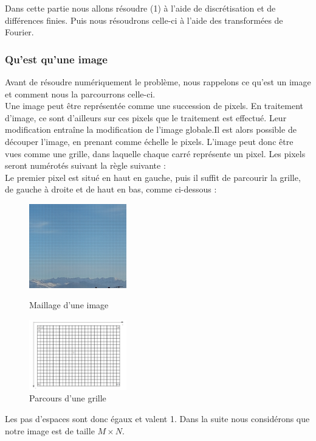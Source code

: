 Dans cette partie nous allons résoudre (1) à l'aide de discrétisation et de différences finies. Puis nous résoudrons celle-ci à l'aide des transformées de Fourier. \\
\subsubsection{Qu'est qu'une image}
Avant de résoudre numériquement le problème, nous rappelons ce qu'est un image et comment nous la  parcourrons celle-ci.\\
Une image peut être représentée comme une succession de pixels. En traitement d'image, ce sont d'ailleurs sur ces pixels que le traitement est effectué. Leur modification entraîne la modification de l'image globale.Il est alors possible de découper l'image, en prenant comme échelle le pixels. L'image peut donc être vues comme une grille, dans laquelle chaque carré représente un pixel. Les pixels seront numérotés suivant la règle suivante : \\

Le premier pixel est situé en haut en gauche, puis il suffit de parcourir la grille, de gauche à droite et de haut en bas, comme ci-dessous :  
\begin{figure}[!htb]
   \begin{minipage}{0.5\textwidth}
     \centering
     \includegraphics[width = 120pt]{Images/Montagne_grille.jpg}
        \caption{Maillage d'une image}
      \end{minipage}\hfill
   \begin{minipage}{0.5\textwidth}
     \centering
     \includegraphics[width = 120pt]{Images/grille.png}
	\caption{Parcours d'une grille}
      \end{minipage}\hfill
\end{figure}

Les pas d'espaces sont donc égaux et valent 1. Dans la suite nous considérons que notre image est de taille $M \times N$.
\newpage
